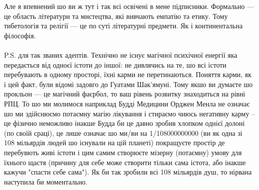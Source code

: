 Але я впевнений шо ви ж тут і так всі освічені в мене підписники. Формально — це область літератури та мистецтва, які вивчають емпатію та етику. Тому тибетологія та релігії — це по суті літературні предмети. Як і континентальна філософія.
\\
\\
P.S. для так званих адептів. Технічно не існує магічної психічної енергії яка передається від одноєї істоти до іншої: не дивлячись на те, шо всі істоти перебувають в одному просторі, їхні карми не перетинаються. Поняття карми, як і цей факт, були відомі задовго до Гуатами Шак'ямуні. Тому якшо ви думаєте шо прокльон — це магічний фаєрбол, то ваш рівень розвитку знаходиться на рівні РПЦ. То шо ми молимося наприклад Будді Медицини Орджен Менла не означає шо ми здійснюємо потаємну магію лікування і стираємо чиюсь негативну карму -- це фізично неможливо інакше Будда би це давно зробив хлопком однієї долоні (по своїй сраці), це лише означає шо ми/ви на 1/108000000000 (ви як одна зі 108 мільярдів людей шо існували на цій планеті) покращуєте простір де перебувють живі істоти і цим самим створюєте мізерну (потаємну) умову для їхнього щастя (причину для себе може створити тільки сама істота, або інакше кажучи "спасти себе сама"). Як би так зробили всі 108 мільярдів душ, то нірвана наступила би моментально.


\normalsize
